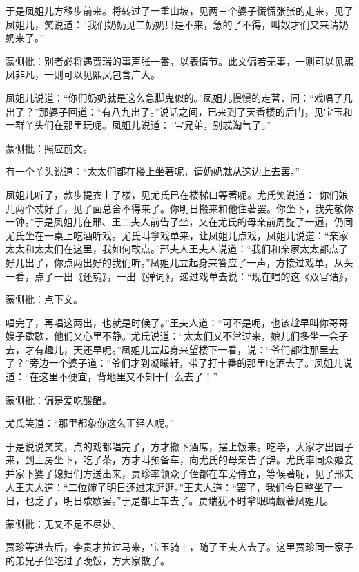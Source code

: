 \begin{parag}
    于是凤姐儿方移步前来。将转过了一重山坡，见两三个婆子慌慌张张的走来，见了凤姐儿，笑说道：“我们奶奶见二奶奶只是不来，急的了不得，叫奴才们又来请奶奶来了。”\begin{note}蒙侧批：别者必将遇贾瑞的事声张一番，以表情节。此文偏若无事，一则可以见熙凤非凡，一则可以见熙凤包含广大。\end{note}凤姐儿说道：“你们奶奶就是这么急脚鬼似的。”凤姐儿慢慢的走著，问：“戏唱了几出了？”那婆子回道：“有八九出了。”说话之间，已来到了天香楼的后门，见宝玉和一群丫头们在那里玩呢。凤姐儿说道：“宝兄弟，别忒淘气了。”\begin{note}蒙侧批：照应前文。\end{note}有一个丫头说道：“太太们都在楼上坐著呢，请奶奶就从这边上去罢。”
\end{parag}


\begin{parag}
    凤姐儿听了，款步提衣上了楼，见尤氏已在楼梯口等著呢。尤氏笑说道：“你们娘儿两个忒好了，见了面总舍不得来了。你明日搬来和他住著罢。你坐下，我先敬你一钟。”于是凤姐儿在邢、王二夫人前告了坐，又在尤氏的母亲前周旋了一遍，仍同尤氏坐在一桌上吃酒听戏。尤氏叫拿戏单来，让凤姐儿点戏，凤姐儿说道：“亲家太太和太太们在这里，我如何敢点。”邢夫人王夫人说道：“我们和亲家太太都点了好几出了，你点两出好的我们听。”凤姐儿立起身来答应了一声，方接过戏单，从头一看，点了一出《还魂》，一出《弹词》，递过戏单去说：“现在唱的这《双官诰》，\begin{note}蒙侧批：点下文。\end{note}唱完了，再唱这两出，也就是时候了。”王夫人道：“可不是呢，也该趁早叫你哥哥嫂子歇歇，他们又心里不静。”尤氏说道：“太太们又不常过来，娘儿们多坐一会子去，才有趣儿，天还早呢。”凤姐儿立起身来望楼下一看，说：“爷们都往那里去了？”旁边一个婆子道：“爷们才到凝曦轩，带了打十番的那里吃酒去了。”凤姐儿说道：“在这里不便宜，背地里又不知干什么去了！”\begin{note}蒙侧批：偏是爱吃酸醋。\end{note}尤氏笑道：“那里都象你这么正经人呢。”
\end{parag}


\begin{parag}
    于是说说笑笑，点的戏都唱完了，方才撤下酒席，摆上饭来。吃毕，大家才出园子来，到上房坐下，吃了茶，方才叫预备车，向尤氏的母亲告了辞。尤氏率同众姬妾并家下婆子媳妇们方送出来，贾珍率领众子侄都在车旁侍立，等候著呢，见了邢夫人王夫人道：“二位婶子明日还过来逛逛。”王夫人道：“罢了，我们今日整坐了一日，也乏了，明日歇歇罢。”于是都上车去了。贾瑞犹不时拿眼睛觑著凤姐儿。\begin{note}蒙侧批：无又不足不尽处。\end{note}贾珍等进去后，李贵才拉过马来，宝玉骑上，随了王夫人去了。这里贾珍同一家子的弟兄子侄吃过了晚饭，方大家散了。
\end{parag}


